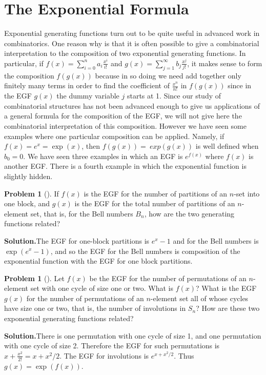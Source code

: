 \documentclass[10pt,]{book}
\theoremstyle{plain}
\theoremstyle{definition}
\newtheorem{activity}[project]{Problem}
\theoremstyle{definition}
\numberwithin{equation}{chapter}
\begin{document}
\section[{The Exponential Formula}]{The Exponential Formula}\label{section-26}
Exponential generating functions turn out to be quite useful in advanced work in combinatorics. One reason why is that it is often possible to give a combinatorial interpretation to the composition of two exponential generating functions. In particular, if \(f(x) =
\sum_{i=0}^n a_i\frac{x^i}{i!}\) and \(g(x) = \sum_{j=1}^\infty b_j \frac{x^j}{j!}\), it makes sense to form the composition \(f(g(x))\) because in so doing we need add together only finitely many terms in order to find the coefficient of \(\frac{x^n}{n!}\) in \(f(g(x))\) since in the EGF \(g(x)\) the dummy variable \(j\) starts at 1. Since our study of combinatorial structures has not been advanced enough to give us applications of a general formula for the composition of the EGF, we will not give here the combinatorial interpretation of this composition. However we have seen some examples where one particular composition can be applied. Namely, if \(f(x) = e^x = \exp(x)\), then \(f(g(x)) =\ exp(g(x))\) is well defined when \(b_0=0\). We have seen three examples in which an EGF is \(e^{f(x)}\) where \(f(x)\) is another EGF. There is a fourth example in which the exponential function is slightly hidden.%
\begin{activity}[]\label{exp_oneblock_}
If \(f(x)\) is the EGF for the number of partitions of an \(n\)-set into one block, and \(g(x)\) is the EGF for the total number of partitions of an \(n\)-element set, that is, for the Bell numbers \(B_n\), how are the two generating functions related?%
\par\medskip\noindent%
\textbf{Solution.}\quad The EGF for one-block partitions is \(e^x-1\) and for the Bell numbers is \(\exp(e^x-1)\), and so the EGF for the Bell numbers is composition of the exponential function with the EGF for one block partitions.%
\end{activity}
\begin{activity}[]\label{exp_oneortwo-cycle_}
Let \(f(x)\) be the EGF for the number of permutations of an \(n\)-element set with one cycle of size one or two. What is \(f(x)\)? What is the EGF \(g(x)\) for the number of permutations of an \(n\)-element set all of whose cycles have size one or two, that is, the number of involutions in \(S_n\)? How are these two exponential generating functions related?%
\par\medskip\noindent%
\textbf{Solution.}\quad There is one permutation with one cycle of size 1, and one permutation with one cycle of size 2. Therefore the EGF for such permutations is \(x+\frac{x^2}{2!}= x+x^2/2\). The EGF for involutions is \(e^{x+x^2/2}\). Thus \(g(x) = \exp(f(x))\).%
\end{activity}
\end{document}
